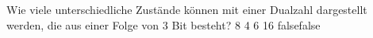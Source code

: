     {Wie viele unterschiedliche Zustände können mit einer Dualzahl dargestellt werden, die aus einer Folge von 3 Bit besteht?}
    {8}
    {4}
    {6}
    {16}
    {false}{false}